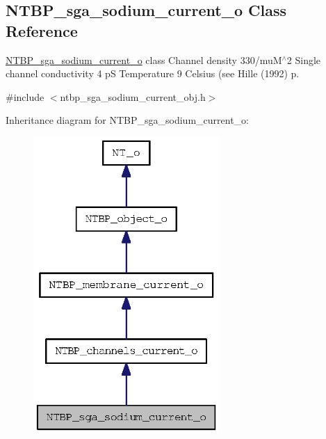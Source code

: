 \subsection{NTBP\_\-sga\_\-sodium\_\-current\_\-o Class Reference}
\label{class_n_t_b_p__sga__sodium__current__o}


\hyperlink{class_n_t_b_p__sga__sodium__current__o}{NTBP\_\-sga\_\-sodium\_\-current\_\-o} class Channel density 330/muM$^\wedge$2 Single channel conductivity 4 pS Temperature 9 Celsius (see Hille (1992) p.  




{\ttfamily \#include $<$ntbp\_\-sga\_\-sodium\_\-current\_\-obj.h$>$}



Inheritance diagram for NTBP\_\-sga\_\-sodium\_\-current\_\-o:
\nopagebreak
\begin{figure}[H]
\begin{center}
\leavevmode
\includegraphics[width=200pt]{class_n_t_b_p__sga__sodium__current__o__inherit__graph}
\end{center}
\end{figure}


